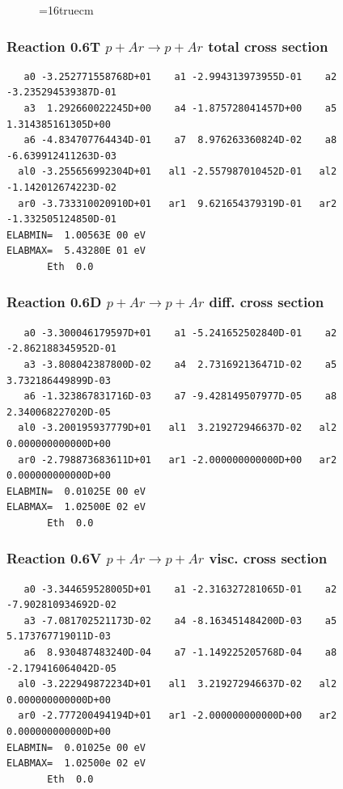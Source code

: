 \documentclass[12pt,dvipdfmx]{article}
\begin{document}
\begin{figure} \label{0.5}
\epsfxsize=16truecm
\end{figure}
\newpage



\subsubsection{
Reaction 0.6T   $ p + Ar \rightarrow p + Ar $ total cross
section }



\begin{small}\begin{verbatim}
   a0 -3.252771558768D+01    a1 -2.994313973955D-01    a2 -3.235294539387D-01
   a3  1.292660022245D+00    a4 -1.875728041457D+00    a5  1.314385161305D+00
   a6 -4.834707764434D-01    a7  8.976263360824D-02    a8 -6.639912411263D-03
  al0 -3.255656992304D+01   al1 -2.557987010452D-01   al2 -1.142012674223D-02
  ar0 -3.733310020910D+01   ar1  9.621654379319D-01   ar2 -1.332505124850D-01
ELABMIN=  1.00563E 00 eV
ELABMAX=  5.43280E 01 eV
       Eth  0.0
\end{verbatim}\end{small}

\subsubsection{
Reaction 0.6D    $p + Ar \rightarrow p + Ar  $ diff. cross
section }


\begin{small}\begin{verbatim}
   a0 -3.300046179597D+01    a1 -5.241652502840D-01    a2 -2.862188345952D-01
   a3 -3.808042387800D-02    a4  2.731692136471D-02    a5  3.732186449899D-03
   a6 -1.323867831716D-03    a7 -9.428149507977D-05    a8  2.340068227020D-05
  al0 -3.200195937779D+01   al1  3.219272946637D-02   al2  0.000000000000D+00
  ar0 -2.798873683611D+01   ar1 -2.000000000000D+00   ar2  0.000000000000D+00
ELABMIN=  0.01025E 00 eV
ELABMAX=  1.02500E 02 eV
       Eth  0.0
\end{verbatim}\end{small}

\subsubsection{
Reaction 0.6V   $ p + Ar \rightarrow p + Ar  $ visc. cross
section }


\begin{small}\begin{verbatim}
   a0 -3.344659528005D+01    a1 -2.316327281065D-01    a2 -7.902810934692D-02
   a3 -7.081702521173D-02    a4 -8.163451484200D-03    a5  5.173767719011D-03
   a6  8.930487483240D-04    a7 -1.149225205768D-04    a8 -2.179416064042D-05
  al0 -3.222949872234D+01   al1  3.219272946637D-02   al2  0.000000000000D+00
  ar0 -2.777200494194D+01   ar1 -2.000000000000D+00   ar2  0.000000000000D+00
ELABMIN=  0.01025e 00 eV
ELABMAX=  1.02500e 02 eV
       Eth  0.0
\end{verbatim}\end{small}
\end{document}
